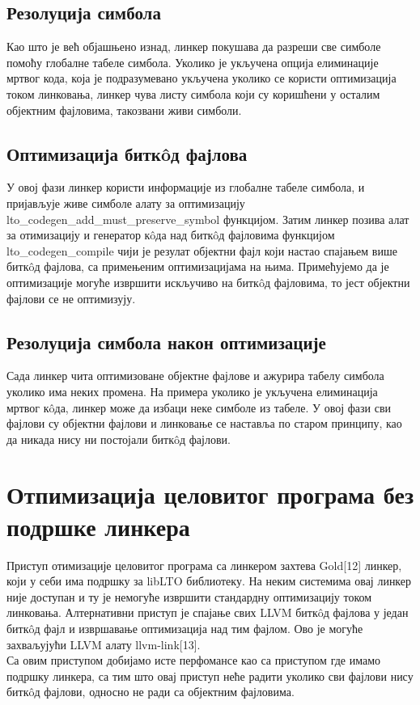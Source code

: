 \documentclass[12pt,oneside]{memoir}
\begin{document}
\subsection{Резолуција симбола}
Као што је већ објашњено изнад, линкер покушава да разреши све симболе помоћу
глобалне табеле симбола.
Уколико је укључена опција елиминације мртвог кода, која је подразумевано укључена
уколико се користи оптимизација током линковања, линкер чува листу симбола који
су коришћени у осталим објектним фајловима, такозвани живи симболи.

\subsection{Оптимизација битк\^{o}д фајлова} 
У овој фази линкер користи информације из глобалне табеле симбола, и пријављује
живе симболе алату за оптимизацију
lto{\_}codegen{\_}add{\_}must{\_}preserve{\_}symbol функцијом.
Затим линкер позива алат за отимизацију и генератор к\^{o}да над битк\^{o}д фајловима
функцијом lto{\_}codegen{\_}compile чији је резулат објектни фајл
који настао спајањем више битк\^{o}д фајлова, са примењеним оптимизацијама на њима.
Примећујемо да је оптимизације могуће извршити искључиво на битк\^{o}д фајловима,
то јест објектни фајлови се не оптимизују.

\subsection{Резолуција симбола након оптимизације}
Сада линкер чита оптимизоване објектне фајлове и ажурира табелу симбола уколико 
има неких промена. На примера уколико је укључена елиминација мртвог к\^{o}да,
линкер може да избаци неке симболе из табеле.
У овој фази сви фајлови су објектни фајлови и линковање се наставља
по старом принципу, као да никада нису ни постојали битк\^{o}д фајлови.

\section{Отпимизација целовитог програма без подршке линкера}
Приступ отимизације целовитог програма са линкером захтева Gold[12] линкер,
који у себи има подршку за libLTO библиотеку.
На неким системима овај линкер није доступан и ту је немогуће извршити стандардну
оптимизацију током линковања.
Алтернативни приступ је спајање свих LLVM битк\^{o}д фајлова у један битк\^{o}д фајл
и извршавање оптимизација над тим фајлом.
Ово је могуће захваљујући LLVM алату llvm-link[13].
\\
Са овим приступом добијамо исте перфомансе као са приступом где имамо подршку линкера,
са тим што овај приступ неће радити уколико сви фајлови нису  битк\^{o}д фајлови,
односно не ради са објектним фајловима.
\end{document}
